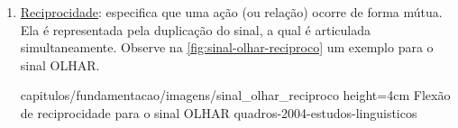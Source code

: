 \begin{enumerate}
\begin{enumerate}


              \item \underline{Reciprocidade}: especifica que uma ação (ou relação) ocorre de forma mútua. Ela é representada pela duplicação do sinal, a qual é articulada simultaneamente.
                    Observe na \autoref{fig:sinal-olhar-reciproco} um exemplo para o sinal OLHAR.

                    {capitulos/fundamentacao/imagens/sinal_olhar_reciproco} %
                    {height=4cm} %
                    {Flexão de reciprocidade para o sinal OLHAR} %
                    {quadros-2004-estudos-linguisticos} %

          \end{enumerate}



\end{enumerate}




